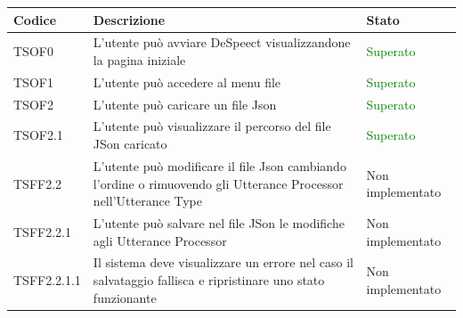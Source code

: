 \documentclass[openany,12pt,a4paper]{report}
\begin{document}
\setlength\LTleft{6mm}
	\begin{longtable}{| p{2cm} |p{8cm} | p{2.5cm} |}
	\hline
	\textbf{Codice} & \textbf{Descrizione} & \textbf{Stato}\\
	\hline
	\endhead
	\newline TSOF0&
	\newline L'utente può avviare DeSpeect visualizzandone la pagina iniziale&
	\newline \textcolor{green}{Superato}
	\\[1em]
	\hline
	\newline TSOF1&
	\newline L'utente può accedere al menu file&
	\newline \textcolor{green}{Superato}
	\\[1em]	
	
	\hline
	
	\newline TSOF2&
	\newline L'utente può caricare un file Json&
	\newline \textcolor{green}{Superato}
	\\[1em]	
	\hline	
	
	\newline TSOF2.1&
	\newline L'utente può visualizzare il percorso del file JSon caricato&
	\newline \textcolor{green}{Superato}
	\\[1em]	
	\hline	
	
	\newline TSFF2.2&
	\newline L'utente può modificare il file Json cambiando l'ordine o rimuovendo gli Utterance Processor nell'Utterance Type&
	\newline Non implementato
	\\[1em]	
	\hline
	
	\newline TSFF2.2.1&
	\newline L'utente può salvare nel file JSon le modifiche agli Utterance Processor&
	\newline Non implementato
	\\[1em]	
	\hline
	
	\newline TSFF2.2.1.1&
	\newline Il sistema deve visualizzare un errore nel caso il salvataggio fallisca e ripristinare uno stato funzionante&
	\newline Non implementato
	\\[1em]	
	\hline
	

\end{longtable}
\end{document}
